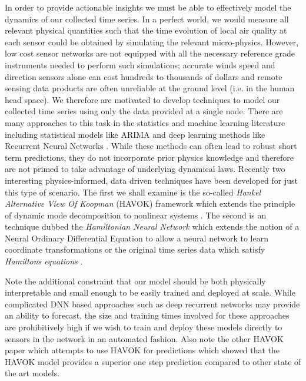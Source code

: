 In order to provide actionable insights we must be able to effectively model the
dynamics of our collected time series. In a perfect world, we would measure all
relevant physical quantities such that the time evolution of local air quality
at each sensor could be obtained by simulating the relevant micro-physics.
However, low cost sensor networks are not equipped with all the necessary
reference grade instruments needed to perform such simulations; accurate winds
speed and direction sensors alone can cost hundreds to thousands of dollars and
remote sensing data products are often unreliable at the ground level (i.e. in
the human head space). We therefore are motivated to develop techniques to model
our collected time series using only the data provided at a single node. There
are many approaches to this task in the statistics and machine learning
literature including statistical models like ARIMA and deep learning methods
like Recurrent Neural Networks \cite{intro-to-time-series-models,
  time-series-rnns}. While these methods can often lead to robust short term
predictions, they do not incorporate prior physics knowledge and therefore are
not primed to take advantage of underlying dynamical laws. Recently two
interesting physics-informed, data driven techniques have been developed for
just this type of scenario. The first we shall examine is the so-called
\textit{Hankel Alternative View Of Koopman} (HAVOK) framework which extends the
principle of dynamic mode decomposition to nonlinear systems
\cite{brunton-havok}. The second is an technique dubbed the \textit{Hamiltonian
  Neural Network} which extends the notion of a Neural Ordinary Differential
Equation to allow a neural network to learn coordinate transformations or the
original time series data which satisfy \textit{Hamiltons equations}
\cite{greydanus-hnn}.




Note the additional constraint that our model should be both physically
interpretable and small enough to be easily trained and deployed at scale. While
complicated DNN based approaches such as deep recurrent networks may provide an
ability to forecast, the size and training times involved for these approaches
are prohibitively high if we wish to train and deploy these models directly to
sensors in the network in an automated fashion. Also note the other HAVOK paper
which attempts to use HAVOK for predictions which showed that the HAVOK model
provides a superior one step prediction compared to other state of the art
models.



